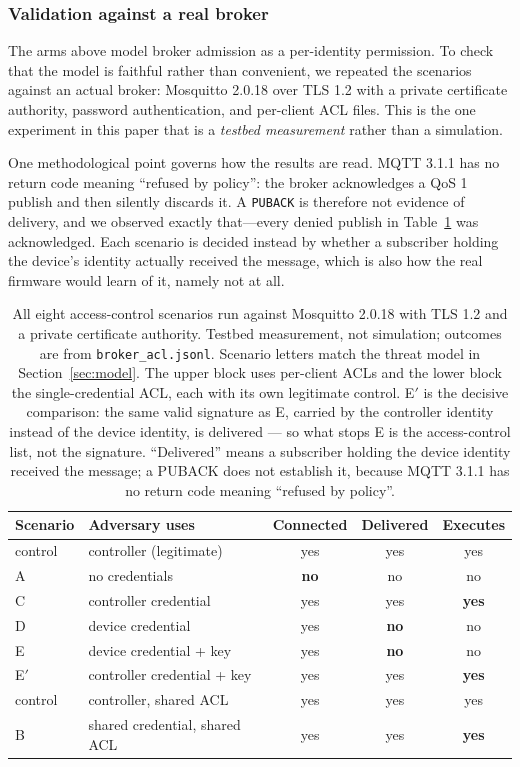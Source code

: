 \subsubsection{Validation against a real broker}
\label{sec:brokerval}

The arms above model broker admission as a per-identity permission. To check that the model is
faithful rather than convenient, we repeated the scenarios against an actual broker: Mosquitto
2.0.18 over TLS 1.2 with a private certificate authority, password authentication, and
per-client ACL files. This is the one experiment in this paper that is a \emph{testbed
measurement} rather than a simulation.

One methodological point governs how the results are read. MQTT 3.1.1 has no return code
meaning ``refused by policy'': the broker acknowledges a QoS 1 publish and then silently
discards it. A \texttt{PUBACK} is therefore not evidence of delivery, and we observed exactly
that---every denied publish in Table~\ref{tab:broker} was acknowledged. Each scenario is
decided instead by whether a subscriber holding the device's identity actually received the
message, which is also how the real firmware would learn of it, namely not at all.

\begin{table}[htbp]
\centering\small
\caption{All eight access-control scenarios run against Mosquitto 2.0.18 with TLS 1.2 and a
private certificate authority. Testbed measurement, not simulation; outcomes are from
\texttt{broker\_acl.jsonl}. Scenario letters match the threat model in
Section~\ref{sec:model}. The upper block uses per-client ACLs and the lower block the
single-credential ACL, each with its own legitimate control. E$'$ is the decisive comparison:
the same valid signature as E, carried by the controller identity instead of the device
identity, is delivered --- so what stops E is the access-control list, not the signature.
``Delivered'' means a subscriber holding the device identity received the message; a PUBACK
does not establish it, because MQTT 3.1.1 has no return code meaning ``refused by policy''.}
\label{tab:broker}
\begin{tabular}{@{}llccc@{}}
\toprule
Scenario & Adversary uses & Connected & Delivered & Executes \\
\midrule
control & controller (legitimate) & yes & yes & yes \\
A & no credentials          & \textbf{no} & no  & no \\
C & controller credential   & yes & yes & \textbf{yes} \\
D & device credential       & yes & \textbf{no}  & no \\
E & device credential + key & yes & \textbf{no}  & no \\
E$'$ & controller credential + key & yes & yes & \textbf{yes} \\
\midrule
control & controller, shared ACL & yes & yes & yes \\
B & shared credential, shared ACL & yes & yes & \textbf{yes} \\
\bottomrule
\end{tabular}
\end{table}

